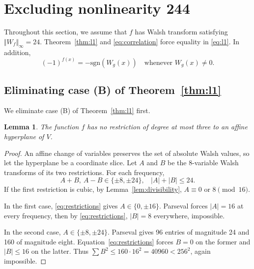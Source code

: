 \documentclass[11pt]{article}
\newtheorem{lemma}{Lemma}
\newtheorem{open problem}{Open problem}
\begin{document}
\section{Excluding nonlinearity 244}
Throughout this section, we assume that $f$ has Walsh transform satisfying ${\Vert W_f\Vert }_{\infty}=24$.
Theorem~\ref{thm:l1} and \eqref{eq:correlation} force equality in \eqref{eq:l1}. In addition,
\begin{equation}\label{eq:negative-sign}
(-1)^{f(x)}=-\text{sgn} (W_g(x))\quad\text{whenever }W_g(x)\ne0.
\end{equation}

\subsection{Eliminating case (B) of Theorem~\ref{thm:l1}}
We eliminate case (B) of Theorem~\ref{thm:l1} first.

\begin{lemma}\label{lem:hyperplane}
The function $f$ has no restriction of degree at most three to an affine hyperplane of $V$.
\end{lemma}
\begin{proof}
An affine change of variables preserves the set of absolute Walsh values, so let the hyperplane be a coordinate slice. Let $A$ and $B$ be the 8-variable Walsh transforms of its two restrictions. For each frequency,
\begin{equation}\label{eq:restrictions}
A+B,\ A-B\in\{\pm8,\pm24\}, \ \ \ \  |A|+|B|\le 24.
\end{equation}
If the first restriction is cubic, by Lemma~\ref{lem:divisibility}, $A\equiv0$ or $8\pmod{16}$.

In the first case, \eqref{eq:restrictions} gives $A\in\{0,\pm16\}$. Parseval forces $|A|=16$ at every frequency, then by \eqref{eq:restrictions}, $|B|=8$ everywhere, impossible.

In the second case, $A\in\{\pm8,\pm24\}$. Parseval gives 96 entries of magnitude 24 and 160 of magnitude eight. Equation~\eqref{eq:restrictions} forces $B=0$ on the former and $|B|\le16$ on the latter. Thus $\sum B^2\le160\cdot16^2=40960<256^2$, again impossible.
\end{proof}
\end{document}

